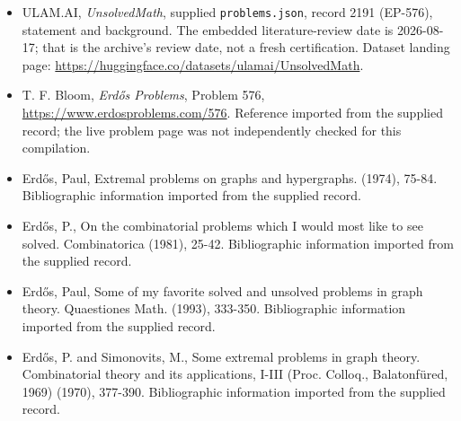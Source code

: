 \documentclass[11pt,a4paper]{article}
\begin{document}
{\small

\begin{itemize}

\item[\hypertarget{source:2191:1}{S1}] ULAM.AI, \emph{UnsolvedMath}, supplied \texttt{problems.json}, record 2191 (EP-576), statement and background. The embedded literature-review date is 2026-08-17; that is the archive’s review date, not a fresh certification. Dataset landing page: \url{https://huggingface.co/datasets/ulamai/UnsolvedMath}.

\item[\hypertarget{source:2191:2}{S2}] T. F. Bloom, \emph{Erdős Problems}, Problem 576, \url{https://www.erdosproblems.com/576}. Reference imported from the supplied record; the live problem page was not independently checked for this compilation.

\item[\hypertarget{source:2191:3}{S3}] Erd\H{o}s, Paul, Extremal problems on graphs and hypergraphs. (1974), 75-84. Bibliographic information imported from the supplied record.

\item[\hypertarget{source:2191:4}{S4}] Erd\H{o}s, P., On the combinatorial problems which I would most like to see solved. Combinatorica (1981), 25-42. Bibliographic information imported from the supplied record.

\item[\hypertarget{source:2191:5}{S5}] Erd\H{o}s, Paul, Some of my favorite solved and unsolved problems in graph theory. Quaestiones Math. (1993), 333-350. Bibliographic information imported from the supplied record.

\item[\hypertarget{source:2191:6}{S6}] Erd\H{o}s, P. and Simonovits, M., Some extremal problems in graph theory. Combinatorial theory and its applications, I-III (Proc. Colloq., Balatonf\"{u}red, 1969) (1970), 377-390. Bibliographic information imported from the supplied record.

\end{itemize}

}

\label{end:2191}
\end{document}
